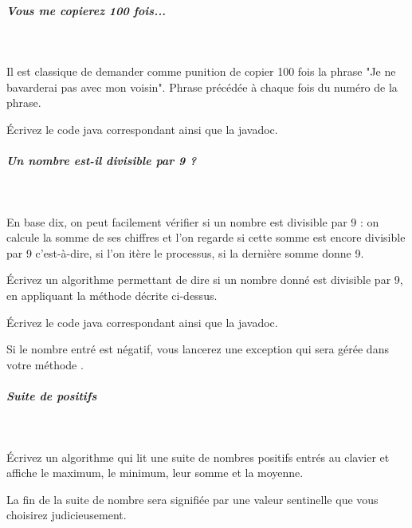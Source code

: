 \documentclass[11pt,a4paper]{article}
\begin{document}
            \par
        
			
		\subparagraph{Vous me copierez 100 fois...} 
		
					\textcolor{white}{.} \par
				
          Il est classique de demander comme punition de copier 100 fois la phrase "Je ne bavarderai pas avec mon voisin". 
          Phrase pr\'ec\'ed\'ee \`a chaque fois du num\'ero de la phrase.
        
            \par
        \'Ecrivez le code java correspondant ainsi que la javadoc.
            \par
        
			
		\subparagraph{Un nombre est-il divisible par 9 ?} 
		
					\textcolor{white}{.} \par
				
          En base dix, on peut facilement v\'erifier si un nombre est divisible par 9 :
          on calcule la somme de ses chiffres et l'on regarde si cette somme est encore divisible par 9
          c'est-\`a-dire, si l'on it\`ere le processus, si la derni\`ere somme donne 9. \par
				
          \'Ecrivez un algorithme permettant de dire si un nombre donn\'e est divisible par 9, en appliquant la m\'ethode d\'ecrite ci-dessus.
        
            \par
        \'Ecrivez le code java correspondant ainsi que la javadoc.
            \par
        Si le nombre entr\'e est n\'egatif, vous lancerez une exception qui sera g\'er\'ee dans votre m\'ethode \verb@main@.
            \par
        
			
		\subparagraph{Suite de positifs} 
		
					\textcolor{white}{.} \par
				
          \'Ecrivez un algorithme qui lit une suite de nombres positifs entr\'es au clavier et affiche
          le maximum, le minimum, leur somme et la moyenne.\par
				
          La fin de la suite de nombre sera signifi\'ee par une valeur sentinelle que vous choisirez
          judicieusement.
        
\end{document}
